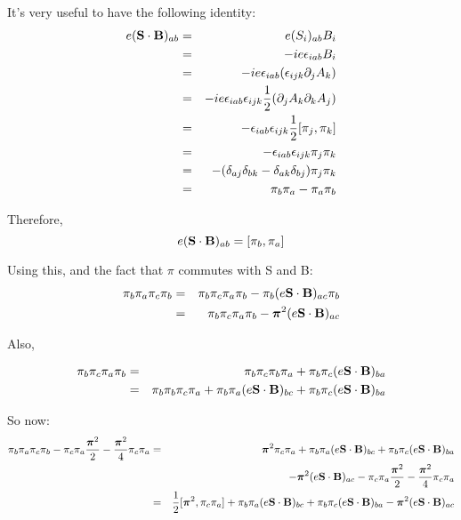 It's very useful to have the following identity:
\begin{eqnarray*}
	e(\mathbf{S} \cdot \mathbf{B})_{ab}
	&=&	e(S_i)_{ab} B_i	\\
	&=&	-i e \epsilon_{iab} B_i 	\\
	&=&	-i e \epsilon_{iab} (\epsilon_{ijk}\partial_j A_k)	\\
	&=&	-i e \epsilon_{iab} \epsilon_{ijk} \frac{1}{2} (\partial_j A_k \partial_k A_j) \\
	&=&	- \epsilon_{iab} \epsilon_{ijk} \frac{1}{2} [\pi_j, \pi_k]	\\
	&=&	-\epsilon_{iab} \epsilon_{ijk} \pi_j \pi_k	\\
	&=&	-(\delta_{aj} \delta_{bk}	- \delta_{ak} \delta_{bj} ) \pi_j \pi_k \\
	&=&	\pi_b \pi_a - \pi_a \pi_b	\\
\end{eqnarray*}

Therefore,
	$$ 	e(\mathbf{S} \cdot \mathbf{B})_{ab} = [\pi_b, \pi_a] $$



Using this, and the fact that $\pi$ commutes with S and B:
\begin{eqnarray*}
\pi_b \pi_a \pi_c \pi_b 
	&=&	\pi_b \pi_c \pi_a \pi_b 
				- \pi_b (e \mathbf{S} \cdot \mathbf{B})_{ac} \pi_b \\
	&=&	\pi_b \pi_c \pi_a \pi_b 
				-\mbox{\boldmath$ \pi $}^2 (e \mathbf{S} \cdot \mathbf{B})_{ac}	\\
\end{eqnarray*}

Also,

\begin{eqnarray*}
\pi_b \pi_c \pi_a \pi_b 
	&=&	\pi_b \pi_c \pi_b \pi_a 
				+ \pi_b \pi_c (e \mathbf{S} \cdot \mathbf{B})_{ba}	\\
	&=&	\pi_b \pi_b \pi_c \pi_a 
				+ \pi_b \pi_a (e \mathbf{S} \cdot \mathbf{B})_{bc}
				+ \pi_b \pi_c (e \mathbf{S} \cdot \mathbf{B})_{ba}	\\
\end{eqnarray*}

So now:
\begin{eqnarray*}
\pi_b \pi_a \pi_c \pi_b  
	- \pi_c \pi_a \frac{\mbox{\boldmath$ \pi $}^2}{2} 
	- \frac{\mbox{\boldmath$ \pi $}^2}{4} \pi_c \pi_a
	&=&	\mbox{\boldmath$ \pi $}^2 \pi_c \pi_a 
				+ \pi_b \pi_a (e \mathbf{S} \cdot \mathbf{B})_{bc}
				+ \pi_b \pi_c (e \mathbf{S} \cdot \mathbf{B})_{ba} \\
	&&			-\mbox{\boldmath$ \pi $}^2 (e \mathbf{S} \cdot \mathbf{B})_{ac}
				- \pi_c \pi_a \frac{\mbox{\boldmath$ \pi $}^2}{2} 
				- \frac{\mbox{\boldmath$ \pi $}^2}{4} \pi_c \pi_a	\\
	&=&	\frac{1}{2} [\mbox{\boldmath$ \pi $}^2, \pi_c \pi_a]
				+ \pi_b \pi_a (e \mathbf{S} \cdot \mathbf{B})_{bc}
				+ \pi_b \pi_c (e \mathbf{S} \cdot \mathbf{B})_{ba}
				-\mbox{\boldmath$ \pi $}^2 (e \mathbf{S} \cdot \mathbf{B})_{ac} \\
\end{eqnarray*}

